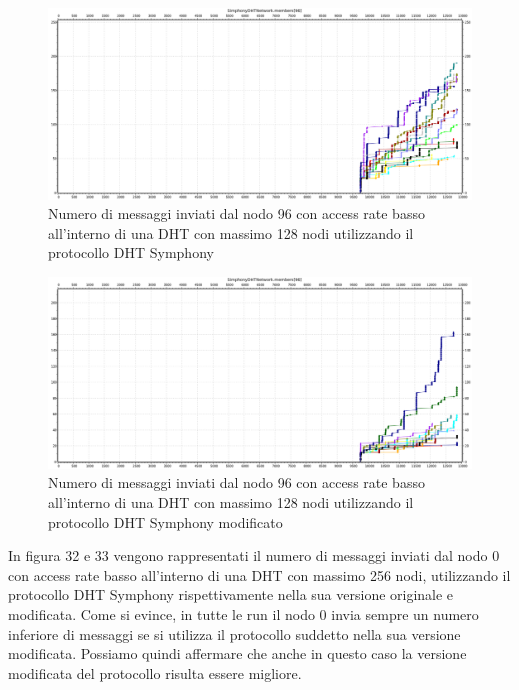 \documentclass[	
	DIV=calc,
	paper=a4,
	fontsize=11pt,
	onecolumn
]{scrartcl} %
\begin{document}
	\begin{figure}[H]
		\centering
		\includegraphics[scale=0.35]	{SymphonyDHT/plots/MessagesSentByEveryNode/128_Nodes_SlowAccess/SymphonyDHT_128Nodes_SlowAccess_Node96.png}
		\caption{Numero di messaggi inviati dal nodo 96 con access rate basso all'interno di una DHT con massimo 128 nodi utilizzando il protocollo DHT Symphony}
		\label{Figura 30}
	\end{figure}
	\begin{figure}[H]
		\centering
		\includegraphics[scale=0.35]	{SymphonyDHTMod/plots/MessagesSentByEveryNode/128_Nodes_SlowAccess/SymphonyDHTMod_128Nodes_SlowAccess_Node96.png}
		\caption{Numero di messaggi inviati dal nodo 96 con access rate basso all'interno di una DHT con massimo 128 nodi utilizzando il protocollo DHT Symphony modificato}
		\label{Figura 31}
	\end{figure}	
	
	In figura 32 e 33 vengono rappresentati il numero di messaggi inviati dal nodo 0 con access rate basso all'interno di una DHT con massimo 256 nodi, utilizzando il protocollo DHT Symphony rispettivamente nella sua versione originale e modificata. Come si evince, in tutte le run il nodo 0 invia sempre un numero inferiore di messaggi se si utilizza il protocollo suddetto nella sua versione modificata. Possiamo quindi affermare che anche in questo caso la versione modificata del protocollo risulta essere migliore.
	
\end{document}
